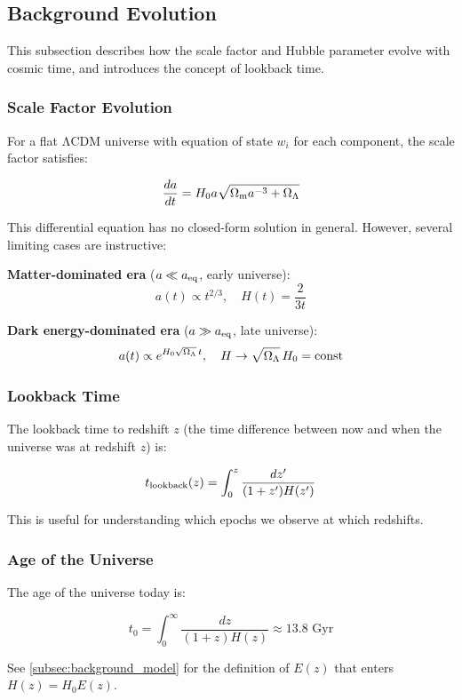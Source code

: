 \subsection{Background Evolution}\label{subsec:background_evolution}

This subsection describes how the scale factor and Hubble parameter evolve with cosmic time, and introduces the concept of lookback time.

\subsubsection{Scale Factor Evolution}

For a flat ΛCDM universe with equation of state $w_i$ for each component, the scale factor satisfies:

\begin{equation}
\frac{da}{dt} = H_0 a \sqrt{\Omega_{\mathrm{m}} a^{-3} + \Omega_{\Lambda}}
\end{equation}

This differential equation has no closed-form solution in general. However, several limiting cases are instructive:

\textbf{Matter-dominated era} ($a \ll a_{\rm eq}$, early universe):
\begin{equation}
a(t) \propto t^{2/3}, \quad H(t) = \frac{2}{3t}
\end{equation}

\textbf{Dark energy-dominated era} ($a \gg a_{\rm eq}$, late universe):
\begin{equation}
a(t) \propto e^{H_0 \sqrt{\Omega_{\Lambda}} \, t}, \quad H \to \sqrt{\Omega_{\Lambda}} \, H_0 = \text{const}
\end{equation}

\subsubsection{Lookback Time}

The lookback time to redshift $z$ (the time difference between now and when the universe was at redshift $z$) is:

\begin{equation}
t_{\rm lookback}(z) = \int_0^z \frac{dz'}{(1+z') H(z')}
\end{equation}

This is useful for understanding which epochs we observe at which redshifts.


\subsubsection{Age of the Universe}

The age of the universe today is:

\begin{equation}
t_0 = \int_0^\infty \frac{dz}{(1+z) H(z)} \approx 13.8 \text{ Gyr}
\end{equation}

See \cref{subsec:background_model} for the definition of $E(z)$ that enters $H(z) = H_0 E(z)$.
